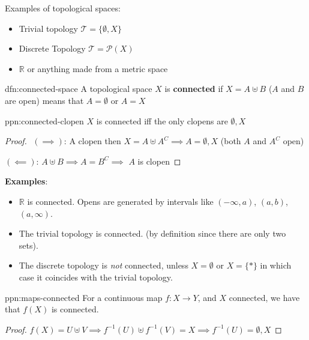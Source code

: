 \documentclass{article}
\begin{document}
Examples of topological spaces:
\begin{itemize}
    \item Trivial topology $\mathcal{T} = \{\emptyset, X\}$
    \item Discrete Topology $\mathcal{T} = \mathcal{P}(X)$
    \item $\mathbb{R}$ or anything made from a metric space
\end{itemize}

\begin{dfn}{dfn:connected-space}{}
    A topological space $X$ is \textbf{connected} if $X = A \uplus B$ ($A$ and $B$ are open) means that $A = \emptyset$ or $A = X$
\end{dfn}

\begin{ppn}{ppn:connected-clopen}{}
    $X$ is connected iff the only clopens are $\emptyset, X$
\end{ppn}

\begin{proof} $ $\newline
$(\implies)$: A clopen then $X = A \uplus A^{C} \implies A = \emptyset, X$ (both $A$ and $A^{C}$ open)

$(\impliedby)$: $A \uplus B \implies A = B^{C} \implies$ $A$ is clopen
\end{proof}

\textbf{Examples}:
\begin{itemize}
    \item $\mathbb{R}$ is connected. Opens are generated by intervals like $(-\infty, a)$, $(a, b)$, $(a, \infty)$.
    \item The trivial topology is connected. (by definition since there are only two sets).
    \item The discrete topology is \textit{not} connected, unless $X = \emptyset$ or $X = \{*\}$ in which case it coincides with the trivial topology.
\end{itemize}

\begin{ppn}{ppn:maps-connected}{}
    For a continuous map $f : X \to Y$, and $X$ connected, we have that $f(X)$ is connected.
\end{ppn}

\begin{proof}
    $f(X) = U \uplus V \implies f^{-1}(U) \uplus f^{-1}(V) = X \implies f^{-1}(U) = \emptyset, X$
\end{proof}
\end{document}
